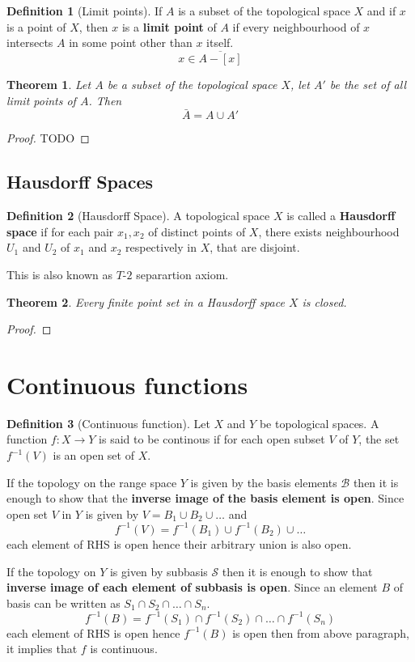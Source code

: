 \documentclass[12pt,reqno]{amsart}
\theoremstyle{plain}
\newtheorem{thm}{Theorem}
\theoremstyle{definition}
\newtheorem{defn}{Definition}
\newcommand{\cal}[1]{\mathcal{#1}}
\begin{document}
\begin{defn}[Limit points]
    If $A$ is a subset of the topological space $X$ and if $x$ is a point of $X$, then $x$ is a {\bf limit point} of $A$ if every neighbourhood of $x$ intersects $A$ in some point other than $x$ itself.
    $$ x \in \overline{A-[x]}$$
\end{defn}
\begin{thm}
    Let $A$ be a subset of the topological space $X$, let $A'$ be the set of all limit points of $A$. Then
    $$ \bar{A} = A \cup A' $$
\end{thm}
\begin{proof}
    TODO
\end{proof}
\subsection{Hausdorff Spaces}
\begin{defn}[Hausdorff Space]
    A topological space $X$ is called a {\bf Hausdorff space} if for each pair $x_1, x_2$ of distinct points of $X$, there exists neighbourhood $U_1$ and $U_2$ of $x_1$ and $x_2$ respectively in $X$, that are disjoint.

    This is also known as $T$-$2$ separartion axiom.
\end{defn}
\begin{thm}
    Every finite point set in a Hausdorff space $X$ is closed.
\end{thm}
\begin{proof}
    
\end{proof}

\section{Continuous functions}
\begin{defn}[Continuous function]
    Let $X$ and $Y$ be topological spaces. A function $f : X \to Y$ is said to be continous if for each open subset $V$ of $Y$, the set $f^{-1}(V)$ is an open set of $X$.    
\end{defn}
If the topology on the range space $Y$ is given by the basis elements $\cal B$ then it is enough to show that the {\bf inverse image of the basis element is open}. Since open set $V$ in $Y$ is given by $ V = B_1 \cup B_2 \cup \dots$ and 
$$ f^{-1}(V) = f^{-1}(B_1) \cup f^{-1}(B_2) \cup \dots $$
each element of RHS is open hence their arbitrary union is also open.

If the topology on $Y$ is given by subbasis $\cal S$ then it is enough to show that {\bf inverse image of each element of subbasis is open}. Since an element $B$ of basis can be written as $S_1 \cap S_2 \cap \dots \cap S_n$.
$$ f^{-1}(B) = f^{-1}(S_1) \cap f^{-1}(S_2) \cap \dots \cap f^{-1}(S_n)$$
each element of RHS is open hence $f^{-1}(B)$ is open then from above paragraph, it implies that $f$ is continuous. 
\end{document}
